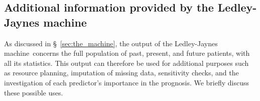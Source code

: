 \documentclass[utf8]{FrontiersinHarvard} %
\newcommand*{\sect}{\S}%
\renewcommand*{\|}[1][]{\nonscript\:#1\vert\nonscript\:\mathopen{}}
\newcommand*{\ljm}{Ledley-Jaynes machine}
\begin{document}


 




\bigskip%
\subsection{Additional information provided by the \ljm}
\label{sec:additional_results}

As discussed in \sect~\ref{sec:the_machine}, the output of the \ljm\ concerns the full population of past, present, and future patients, with all its statistics. This output can therefore be used for additional purposes such as resource planning, imputation of missing data, sensitivity checks, and the investigation of each predictor's importance in the prognosis. We briefly discuss these possible uses.
\end{document}
